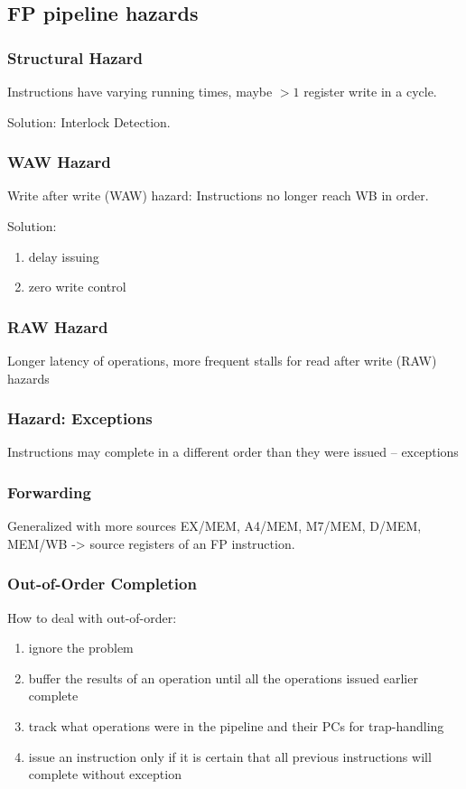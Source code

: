 \subsection{FP pipeline hazards}
\subsubsection{Structural Hazard}
Instructions have varying running
times, maybe $>1$ register write in a
cycle. 

Solution: Interlock Detection. 

\subsubsection{WAW Hazard}
Write after write (WAW) hazard: Instructions no longer reach WB in order.

Solution:
\begin{enumerate}
    \item delay issuing
    \item zero write control
\end{enumerate}

\subsubsection{RAW Hazard}
Longer latency of operations,  more frequent stalls for
read after write (RAW) hazards

\subsubsection{Hazard: Exceptions}
Instructions may complete in a different order than they were issued – exceptions

\subsubsection{Forwarding}

Generalized with more sources EX/MEM, A4/MEM, M7/MEM, D/MEM, MEM/WB -> source registers of an FP instruction. 


\subsubsection{Out-of-Order Completion}
How to deal with out-of-order:
\begin{enumerate}
    \item ignore the problem
    \item buffer the results of an operation
    until all the operations issued earlier
    complete
    \item track what operations were in the
    pipeline and their PCs for trap-handling
    \item issue an instruction only if it is
    certain that all previous instructions
    will complete without exception
\end{enumerate}

